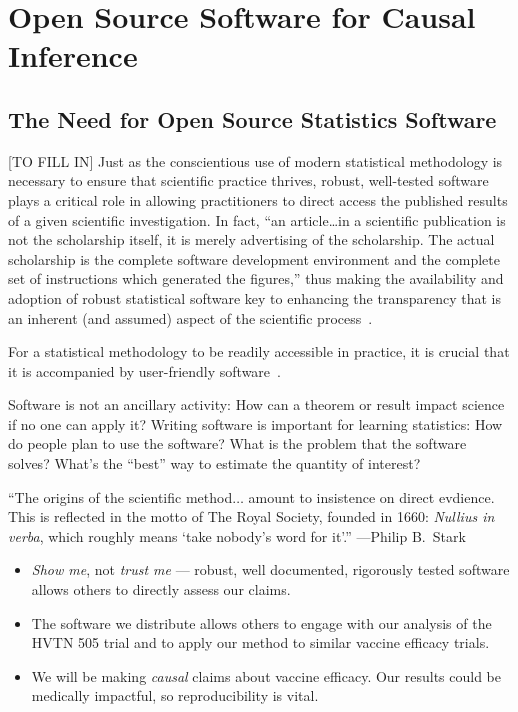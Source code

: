 \chapter{Open Source Software for Causal Inference}\label{five}

\section{The Need for Open Source Statistics Software}

[TO FILL IN]
Just as the conscientious use of modern statistical methodology is necessary to
ensure that scientific practice thrives, robust, well-tested software plays
a critical role in allowing practitioners to direct access the published results
of a given scientific investigation. In fact, “an article…in a scientific
publication is not the scholarship itself, it is merely advertising of the
scholarship. The actual scholarship is the complete software development
environment and the complete set of instructions which generated the figures,”
thus making the availability and adoption of robust statistical software key to
enhancing the transparency that is an inherent (and assumed) aspect of the
scientific process~\citep{buckheit1995wavelab}.

For a statistical methodology to be readily accessible in practice, it is
crucial that it is accompanied by user-friendly
software~\citep{pullenayegum2016knowledge, stromberg2004write}.

\citet{peng2011reproducible, kitzes2017practice, peng2009reproducible,
stodden2014implementing, millman2018developing, vdl2022targeted}


Software is not an ancillary activity: How can a theorem or
result impact science if no one can apply it?
Writing software is important for learning statistics:
How do people plan to use the software?
What is the problem that the software solves?
What’s the “best” way to estimate the quantity of interest?


  ``The origins of the scientific method$\ldots$ amount to insistence on
  direct evdience. This is reflected in the motto of The Royal Society, founded
  in 1660: \textit{Nullius in verba}, which roughly means `take nobody's word
  for it'.'' ---Philip B.~Stark~\citep{kitzes2017practice}

\begin{itemize}
  \itemsep4pt
  \item \textit{Show me}, not \textit{trust me} --- robust, well documented,
    rigorously tested software allows others to directly assess our claims.
  \item The software we distribute allows others to engage with our analysis of
    the HVTN 505 trial and to apply our method to similar vaccine efficacy
    trials.
  \item We will be making \textit{causal} claims about vaccine efficacy. Our
    results could be medically impactful, so reproducibility is vital.
\end{itemize}

